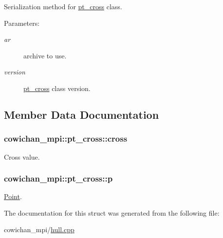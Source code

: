 Serialization method for \hyperlink{structcowichan__mpi_1_1pt__cross}{pt\_\-cross} class. \begin{Desc}
\item[Parameters:]
\begin{description}
\item[{\em ar}]archive to use. \item[{\em version}]\hyperlink{structcowichan__mpi_1_1pt__cross}{pt\_\-cross} class version. \end{description}
\end{Desc}


\subsection{Member Data Documentation}
\hypertarget{structcowichan__mpi_1_1pt__cross_33466b2228b7e4bb94efb8d04ca19f81}{
\subsubsection[{cross}]{ {\bf cowichan\_\-mpi::pt\_\-cross::cross}}}
\label{structcowichan__mpi_1_1pt__cross_33466b2228b7e4bb94efb8d04ca19f81}


Cross value. \hypertarget{structcowichan__mpi_1_1pt__cross_b829b3769c8e6c61221d1f9a41e18a83}{
\subsubsection[{p}]{ {\bf cowichan\_\-mpi::pt\_\-cross::p}}}
\label{structcowichan__mpi_1_1pt__cross_b829b3769c8e6c61221d1f9a41e18a83}


\hyperlink{class_point}{Point}. 

The documentation for this struct was generated from the following file:\begin{CompactItemize}
\item 
cowichan\_\-mpi/\hyperlink{cowichan__mpi_2hull_8cpp}{hull.cpp}\end{CompactItemize}
